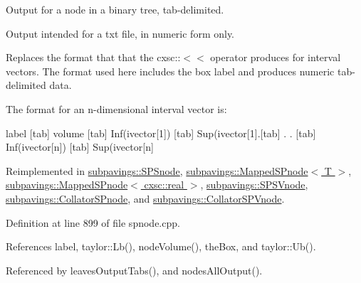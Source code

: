 \-Output for a node in a binary tree, tab-\/delimited. 

\-Output intended for a txt file, in numeric form only.

\-Replaces the format that that the cxsc\-:\-:$<$$<$ operator produces for interval vectors. \-The format used here includes the box label and produces numeric tab-\/delimited data.

\-The format for an n-\/dimensional interval vector is\-:

label \mbox{[}tab\mbox{]} volume \mbox{[}tab\mbox{]} \-Inf(ivector\mbox{[}1\mbox{]}) \mbox{[}tab\mbox{]} \-Sup(ivector\mbox{[}1\mbox{]}.\mbox{[}tab\mbox{]} . . \mbox{[}tab\mbox{]} \-Inf(ivector\mbox{[}n\mbox{]}) \mbox{[}tab\mbox{]} \-Sup(ivector\mbox{[}n\mbox{]} 

\-Reimplemented in \hyperlink{classsubpavings_1_1SPSnode_a3cc0c8bb64c854ef16ba03891f5945d6}{subpavings\-::\-S\-P\-Snode}, \hyperlink{classsubpavings_1_1MappedSPnode_aa35a5e2e8518004e8feefb3bdea98d53}{subpavings\-::\-Mapped\-S\-Pnode$<$ T $>$}, \hyperlink{classsubpavings_1_1MappedSPnode_aa35a5e2e8518004e8feefb3bdea98d53}{subpavings\-::\-Mapped\-S\-Pnode$<$ cxsc\-::real $>$}, \hyperlink{classsubpavings_1_1SPSVnode_a01b35db8ce4b99460ff352f6d25a529c}{subpavings\-::\-S\-P\-S\-Vnode}, \hyperlink{classsubpavings_1_1CollatorSPnode_ab2e1cd11ef3dd4424cf491e529ed0fd8}{subpavings\-::\-Collator\-S\-Pnode}, and \hyperlink{classsubpavings_1_1CollatorSPVnode_a60e3798526abbe3db915b8a9a9d0aa19}{subpavings\-::\-Collator\-S\-P\-Vnode}.



\-Definition at line 899 of file spnode.\-cpp.



\-References label, taylor\-::\-Lb(), node\-Volume(), the\-Box, and taylor\-::\-Ub().



\-Referenced by leaves\-Output\-Tabs(), and nodes\-All\-Output().


